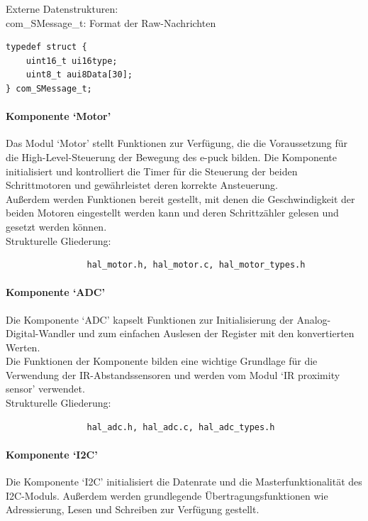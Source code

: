 \documentclass[10pt,a4paper]{article}
\begin{document}
				Externe Datenstrukturen: \\
				com\_SMessage\_t: Format der Raw-Nachrichten
				
				\lstset{language = C, tabsize = 4}
				\begin{lstlisting}[captionpos=b, caption={com\_SMessage\_t}, frame = single]
typedef struct {
	uint16_t ui16type;
	uint8_t aui8Data[30];
} com_SMessage_t;
				\end{lstlisting}
				
			\paragraph*{Komponente `Motor'}
			Das Modul `Motor' stellt Funktionen zur Verfügung, die die Voraussetzung für die High-Level-Steuerung der Bewegung des e-puck bilden.
			Die Komponente initialisiert und kontrolliert die Timer für die Steuerung der beiden Schrittmotoren und gewährleistet deren korrekte
			Ansteuerung. \\
			Außerdem werden Funktionen bereit gestellt, mit denen die Geschwindigkeit der beiden Motoren eingestellt werden kann und deren
			Schrittzähler gelesen und gesetzt werden können. \\
			
			Strukturelle Gliederung:
				\begin{verbatim}  
				hal_motor.h, hal_motor.c, hal_motor_types.h
				\end{verbatim}
						
			\paragraph*{Komponente `ADC'}
			Die Komponente `ADC' kapselt Funktionen zur Initialisierung der Analog-Digital-Wandler und zum einfachen Auslesen der Register
			mit den konvertierten Werten. \\
			Die Funktionen der Komponente bilden eine wichtige Grundlage für die Verwendung der IR-Abstandssensoren und werden vom Modul `IR 
			proximity sensor' verwendet.\\
			
			Strukturelle Gliederung:
				\begin{verbatim}  
				hal_adc.h, hal_adc.c, hal_adc_types.h
				\end{verbatim}
			
			\paragraph*{Komponente `I2C'}
			Die Komponente `I2C' initialisiert die Datenrate und die Masterfunktionalität des I2C-Moduls.
			Außerdem werden grundlegende Übertragungsfunktionen wie Adressierung, Lesen und Schreiben zur Verfügung gestellt. \\
			
\end{document}
